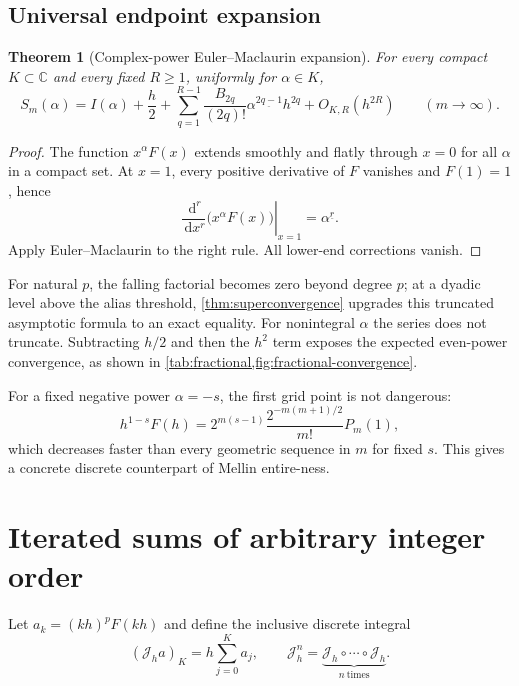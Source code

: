 \documentclass[11pt]{article}
\newtheorem{theorem}{Theorem}[section]
\theoremstyle{definition}
\theoremstyle{remark}
\newcommand{\C}{\mathbb C}
\newcommand{\fall}[2]{#1^{\underline{#2}}}
\newcommand{\dd}{\,\mathrm d}
\newcommand{\J}{\mathcal J}
\begin{document}
\subsection{Universal endpoint expansion}

\begin{theorem}[Complex-power Euler--Maclaurin expansion]\label{thm:alpha-EM}
For every compact $K\subset\C$ and every fixed $R\ge1$, uniformly for
$\alpha\in K$,
\begin{equation}\label{eq:alpha-EM}
 S_m(\alpha)=I(\alpha)+\frac h2
 +\sum_{q=1}^{R-1}\frac{B_{2q}}{(2q)!}
   \fall{\alpha}{2q-1}h^{2q}
 +O_{K,R}(h^{2R})
 \qquad(m\to\infty).
\end{equation}
\end{theorem}

\begin{proof}
The function $x^\alpha F(x)$ extends smoothly and flatly through $x=0$ for
all $\alpha$ in a compact set.  At $x=1$, every positive derivative of $F$
vanishes and $F(1)=1$, hence
\[
 \left.\frac{\dd^r}{\dd x^r}\bigl(x^\alpha F(x)\bigr)\right|_{x=1}
 =\fall\alpha r.
\]
Apply Euler--Maclaurin to the right rule.  All lower-end corrections vanish.
\end{proof}

For natural $p$, the falling factorial becomes zero beyond degree $p$; at a
dyadic level above the alias threshold, \cref{thm:superconvergence} upgrades
this truncated asymptotic formula to an exact equality.  For nonintegral
$\alpha$ the series does not truncate.  Subtracting $h/2$ and then the $h^2$
term exposes the expected even-power convergence, as shown in
\cref{tab:fractional,fig:fractional-convergence}.

For a fixed negative power $\alpha=-s$, the first grid point is not dangerous:
\begin{equation}\label{eq:first-node}
 h^{1-s}F(h)=
 2^{m(s-1)}\frac{2^{-m(m+1)/2}}{m!}P_m(1),
\end{equation}
which decreases faster than every geometric sequence in $m$ for fixed $s$.
This gives a concrete discrete counterpart of Mellin entire-ness.

\section{Iterated sums of arbitrary integer order}

Let $a_k=(kh)^pF(kh)$ and define the inclusive discrete integral
\[
 (\J_h a)_K=h\sum_{j=0}^{K}a_j,
 \qquad
 \J_h^n=\underbrace{\J_h\circ\cdots\circ\J_h}_{n\ \mathrm{times}}.
\]
\end{document}
